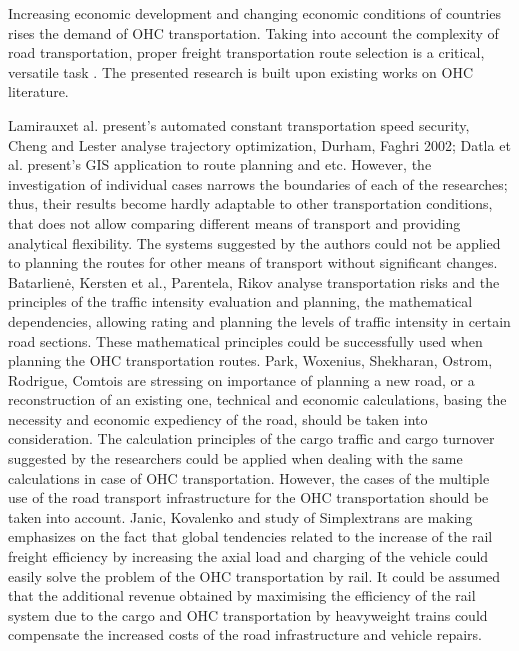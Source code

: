 %

Increasing economic development and changing economic conditions of countries rises the demand of OHC transportation. Taking into account the complexity of road transportation, proper freight transportation route selection is a critical, versatile task \cite{bazaras2013optimal, xu2001methodology, sivilevicius2007dynamics}. 
The presented research is built upon existing works on OHC literature. 

Lamirauxet al. present’s automated constant transportation speed security, Cheng and Lester analyse trajectory optimization, Durham, Faghri 2002; Datla et al. present’s GIS application to route planning and etc. However, the investigation of individual cases narrows the boundaries of each of the researches; thus, their results become hardly adaptable to other transportation conditions, that does not allow comparing different means of transport and providing analytical flexibility. The systems suggested by the authors could not be applied to planning the routes for other means of transport without significant changes.  Batarlienė, Kersten et al., Parentela, Rikov analyse transportation risks and the principles of the traffic intensity evaluation and planning, the mathematical dependencies, allowing rating and planning the levels of traffic intensity in certain road sections. These mathematical principles could be successfully used when planning the OHC transportation routes. Park, Woxenius, Shekharan, Ostrom, Rodrigue, Comtois are stressing on importance of planning a new road, or a reconstruction of an existing one, technical and economic calculations, basing the necessity and economic expediency of the road, should be taken into consideration. The calculation principles of the cargo traffic and cargo turnover suggested by the researchers could be applied when dealing with the same calculations in case of OHC  transportation. However, the cases of the multiple use of the road transport infrastructure for the OHC transportation should be taken into account. Janic, Kovalenko and study of Simplextrans are making emphasizes on the fact that global tendencies related to the increase of the rail freight efficiency by increasing the axial load and charging of the vehicle could easily solve the problem of the OHC transportation by rail. It could be assumed that the additional revenue obtained by maximising the efficiency of the rail system due to the cargo and OHC transportation by heavyweight trains could compensate the increased costs of the road infrastructure and vehicle repairs.

